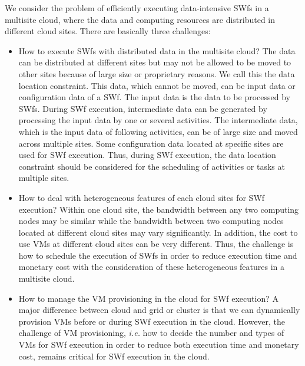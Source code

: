 We consider the problem of efficiently executing data-intensive SWfs in a multisite cloud, where the data and computing resources are distributed in different cloud sites. There are basically three challenges:
\begin{itemize}
\item How to execute SWfs with distributed data in the multisite cloud? The data can be distributed at different sites but may not be allowed to be moved to other sites because of large size or proprietary reasons. We call this the data location constraint. This data, which cannot be moved, can be input data or configuration data of a SWf. The input data is the data to be processed by SWfs. During SWf execution, intermediate data can be generated by processing the input data by one or several activities. The intermediate data, which is the input data of following activities, can be of large size and moved across multiple sites. Some configuration data located at specific sites are used for SWf execution. Thus, during SWf execution, the data location constraint should be considered for the scheduling of activities or tasks at multiple sites. 
\item How to deal with heterogeneous features of each cloud sites for SWf execution? Within one cloud site, the bandwidth between any two computing nodes may be similar while the bandwidth between two computing nodes located at different cloud sites may vary significantly. In addition, the cost to use VMs at different cloud sites can be very different. Thus, the challenge is how to schedule the execution of SWfs in order to reduce execution time and monetary cost with the consideration of these heterogeneous features in a multisite cloud.
\item How to manage the VM provisioning in the cloud for SWf execution? A major difference between cloud and grid or cluster is that we can dynamically provision VMs before or during SWf execution in the cloud. However, the challenge of VM provisioning, \textit{i.e.} how to decide the number and types of VMs for SWf execution in order to reduce both execution time and monetary cost, remains critical for SWf execution in the cloud. 
\end{itemize}


